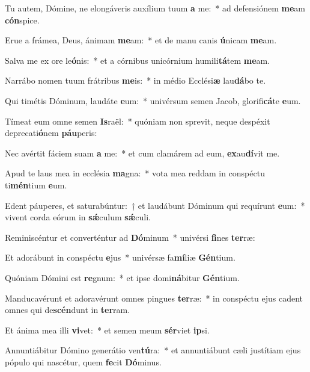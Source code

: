 \item Tu autem, Dómine, ne elongáveris auxílium tuum \textbf{a} me:~* ad defensiónem \textbf{me}am \textbf{cón}spice.
\item Erue a frámea, Deus, ánimam \textbf{me}am:~* et de manu canis \textbf{ú}nicam \textbf{me}am.
\item Salva me ex ore le\textbf{ó}nis:~* et a córnibus unicórnium humili\textbf{tá}tem \textbf{me}am.
\item Narrábo nomen tuum frátribus \textbf{me}is:~* in médio Ecclési\textbf{æ} lau\textbf{dá}bo te.
\item Qui timétis Dóminum, laudáte \textbf{e}um:~* univérsum semen Jacob, glorifi\textbf{cá}te \textbf{e}um.
\item Tímeat eum omne semen \textbf{Is}raël:~* quóniam non sprevit, neque despéxit deprecati\textbf{ó}nem \textbf{páu}peris:
\item Nec avértit fáciem suam \textbf{a} me:~* et cum clamárem ad eum, \textbf{ex}au\textbf{dí}vit me.
\item Apud te laus mea in ecclésia \textbf{ma}gna:~* vota mea reddam in conspéctu ti\textbf{mén}tium \textbf{e}um.
\item Edent páuperes, et saturabúntur:~† et laudábunt Dóminum qui requírunt \textbf{e}um:~* vivent corda eórum in \textbf{sǽ}culum \textbf{sǽ}culi.
\item Reminiscéntur et converténtur ad \textbf{Dó}minum~* univérsi \textbf{fi}nes \textbf{ter}ræ:
\item Et adorábunt in conspéctu \textbf{e}jus~* univérsæ fa\textbf{mí}liæ \textbf{Gén}tium.
\item Quóniam Dómini est \textbf{re}gnum:~* et ipse domi\textbf{ná}bitur \textbf{Gén}tium.
\item Manducavérunt et adoravérunt omnes pingues \textbf{ter}ræ:~* in conspéctu ejus cadent omnes qui de\textbf{scén}dunt in \textbf{ter}ram.
\item Et ánima mea illi \textbf{vi}vet:~* et semen meum \textbf{sér}viet \textbf{ip}si.
\item Annuntiábitur Dómino generátio ven\textbf{tú}ra:~* et annuntiábunt cæli justítiam ejus pópulo qui nascétur, quem \textbf{fe}cit \textbf{Dó}minus.
